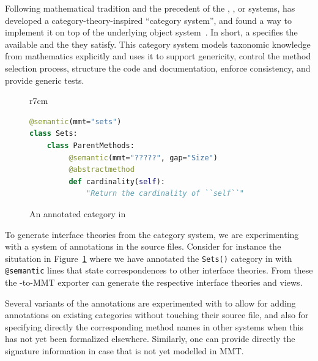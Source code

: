Following mathematical tradition and the precedent of the \Axiom,
\Fricas, or \MuPAD systems, \Sage has developed a
category-theory-inspired ``category system'', and found a way to
implement it on top of the underlying \Python object
system~\cite{Sage.Categories}. In short, a  specifies
the available  and the  they satisfy.
%
This category system models taxonomic knowledge from mathematics
explicitly and uses it to support genericity, control the method
selection process, structure the code and documentation, enforce
consistency, and provide generic tests.

\begin{figure}r{7cm}\vspace*{-2.5em}
\begin{lstlisting}[language=Python]
@semantic(mmt="sets")
class Sets:
    class ParentMethods:
         @semantic(mmt="?????", gap="Size")
         @abstractmethod
         def cardinality(self):
             "Return the cardinality of ``self``"
\end{lstlisting}
\vspace*{-.5em}
\caption{An annotated category in \Sage}\label{fig:anncat}\vspace*{-1.5em}
\end{figure}
To generate interface theories from the \Sage category system, we are experimenting with a
system of annotations in the \Sage source files. Consider for instance the situtation in
Figure~\ref{fig:anncat} where we have annotated the \texttt{Sets()} category in \Sage
with \texttt{@semantic} lines that state correspondences to other interface theories. From
these the \Sage-to-MMT exporter can generate the respective interface theories and views.

Several variants of the annotations are experimented with to allow for adding annotations on existing
categories without touching their source file, and also for specifying directly the corresponding
method names in other systems when this has not yet been formalized elsewhere. Similarly,
one can provide directly the signature information in case that is not yet modelled in
MMT.


